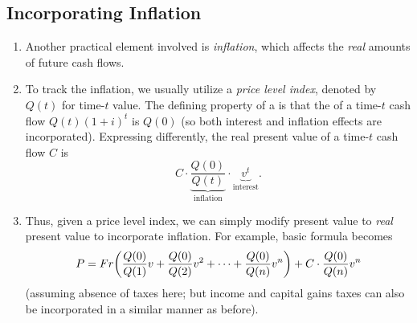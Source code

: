 \subsection{Incorporating Inflation}
\begin{enumerate}
\item Another practical element involved is \emph{inflation}, which affects the
\emph{real} amounts of future cash flows.

\item \label{it:real-pv-fmla}
To track the inflation, we usually utilize a \emph{price level index},
denoted by \(Q(t)\) for time-\(t\) value. The defining property of a
 is that the  of a time-\(t\) cash flow
\(Q(t)(1+i)^t\) is \(Q(0)\) (so both interest and inflation effects are
incorporated). Expressing differently, the real present value of a time-\(t\)
cash flow \(C\) is
\[
C\cdot\underbrace{\frac{Q(0)}{Q(t)}}_{\text{inflation}}\cdot\underbrace{v^t}_{\text{interest}}.
\]
\item Thus, given a price level index, we can simply modify present value to
\emph{real} present value to incorporate inflation. For example, basic formula
becomes
\[
P=Fr\qty(\frac{Q(0)}{Q(1)}v+\frac{Q(0)}{Q(2)}v^{2}+\dotsb+\frac{Q(0)}{Q(n)}v^{n})+C\cdot\frac{Q(0)}{Q(n)}v^n
\]
(assuming absence of taxes here; but income and capital gains taxes can also be
incorporated in a similar manner as before).
\end{enumerate}
